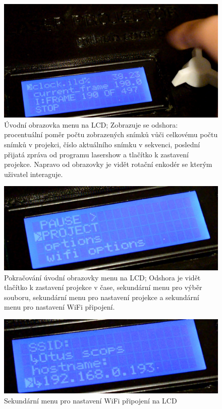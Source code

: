 \begin{figure}[H]
    \centering
    \includegraphics[width=1\textwidth]{img/ui_lcd_main.jpg}
    \caption{\label{fig:uilcdmain} Úvodní obrazovka menu na LCD; Zobrazuje se odshora: procentuální poměr počtu zobrazených snímků vůči celkovému počtu snímků v projekci, číslo aktuálního snímku v sekvenci, poslední přijatá zpráva od programu lasershow a tlačítko k zastavení projekce. Napravo od obrazovky je vidět rotační enkodér se kterým uživatel interaguje.}
\end{figure}
\begin{figure}[H]
    \centering
    \includegraphics[width=1\textwidth]{img/ui_lcd_second.jpg}
    \caption{\label{fig:uilcdsec} Pokračování úvodní obrazovky menu na LCD; Odshora je vidět tlačítko k zastavení projekce v čase, sekundární menu pro výběr souboru, sekundární menu pro nastavení projekce a sekundární menu pro nastavení WiFi připojení.}
\end{figure}
\begin{figure}[H]
    \centering
    \includegraphics[width=1\textwidth]{img/ui_lcd_wifi.jpg}
    \caption{\label{fig:uilcdwifi} Sekundární menu pro nastavení WiFi připojení na LCD}
\end{figure}

